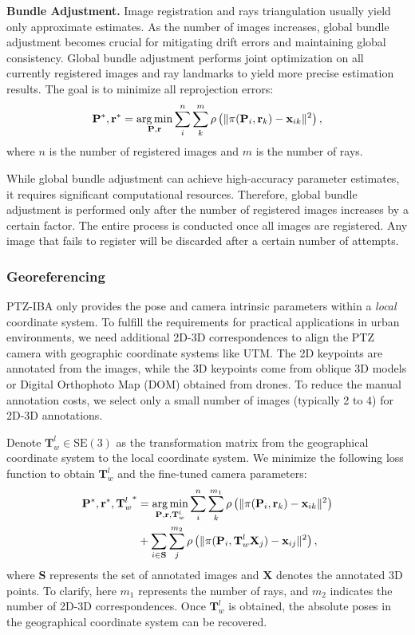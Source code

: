 \textbf{Bundle Adjustment.}
Image registration and rays triangulation usually yield only approximate estimates. As the number of images increases, global bundle adjustment becomes crucial for mitigating drift errors and maintaining global consistency.
Global bundle adjustment performs joint optimization on all currently registered images and ray landmarks to yield more precise estimation results. The goal is to minimize all reprojection errors:
\begin{equation}
    \mathbf{P}^*, \mathbf{r}^* = \operatorname*{arg\,min}_{\mathbf{P}, \mathbf{r}} \sum^n_i \sum^m_k \rho \left( \| \pi(\mathbf{P}_i, \mathbf{r}_k) - \mathbf{x}_{ik} \|^2 \right),
\end{equation}
\noindent where $n$ is the number of registered images and $m$ is the number of rays.

While global bundle adjustment can achieve high-accuracy parameter estimates, it requires significant computational resources.
Therefore, global bundle adjustment is performed only after the number of registered images increases by a certain factor. The entire process is conducted once all images are registered. Any image that fails to register will be discarded after a certain number of attempts.

\subsubsection{Georeferencing}
PTZ-IBA only provides the pose and camera intrinsic parameters within a \textit{local} coordinate system. To fulfill the requirements for practical applications in urban environments, we need additional 2D-3D correspondences to align the PTZ camera with geographic coordinate systems like UTM. 
The 2D keypoints are annotated from the images, while the 3D keypoints come from oblique 3D models or Digital Orthophoto Map (DOM) obtained from drones. To reduce the manual annotation costs, we select only a small number of images (typically 2 to 4) for 2D-3D annotations.

Denote $\mathbf{T}^l_w \in \mathrm{SE}(3)$ as the transformation matrix from the geographical coordinate system to the local coordinate system. We minimize the following loss function to obtain $\mathbf{T}^l_w$ and the fine-tuned camera parameters:
\begin{equation}
\begin{aligned}
    \mathbf{P}^*, \mathbf{r}^*, {\mathbf{T}^l_w}^* &= \operatorname*{arg\,min}_{\mathbf{P}, \mathbf{r}, \mathbf{T}^l_w} \sum^n_i \sum^{m_1}_k \rho \left( \| \pi(\mathbf{P}_i, \mathbf{r}_k) - \mathbf{x}_{ik} \|^2 \right) \\
    &+ \sum_{i \in \mathbf{S}} \sum^{m_2}_j \rho \left( \| \pi(\mathbf{P}_i, \mathbf{T}^l_w \mathbf{X}_j) - \mathbf{x}_{ij} \|^2 \right),
\end{aligned}
\end{equation}
\noindent where $\mathbf{S}$ represents the set of annotated images and $\mathbf{X}$ denotes the annotated 3D points. 
To clarify, here $m_1$ represents the number of rays, and $m_2$ indicates the number of 2D-3D correspondences. Once $\mathbf{T}^l_w$ is obtained, the absolute poses in the geographical coordinate system can be recovered. 

